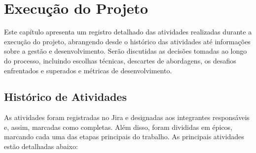     \chapter{Execução do Projeto}

    Este capítulo apresenta um registro detalhado das atividades realizadas durante a execução do projeto, abrangendo desde o histórico das atividades até informações sobre a gestão e desenvolvimento. Serão discutidas as decisões tomadas ao longo do processo, incluindo escolhas técnicas, descartes de abordagens, os desafios enfrentados e superados e métricas de desenvolvimento. 

    \section{Histórico de Atividades}
    As atividades foram registradas no Jira e designadas aos integrantes responsáveis e, assim, marcadas como completas. Além disso, foram divididas em épicos, marcando cada uma das etapas principais do trabalho. As principais atividades estão detalhadas abaixo:


